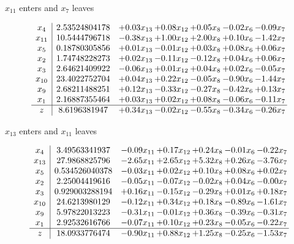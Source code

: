\documentclass[9pt]{article}
\begin{document}
 $ x_{11} $ enters and $ x_{7} $ leaves 

 \[\begin{array}{c| c c@{\hskip 2pt} c@{\hskip 2pt} c@{\hskip 2pt} c@{\hskip 2pt} c@{\hskip 2pt} }
 x_{4}   &  2.53524804178 & +  0.03 x_{13} & +  0.08 x_{12} & +  0.05 x_{8} & -0.02 x_{6} & -0.09 x_{7}\\
 x_{11}   &  10.5444796718 & -0.38 x_{13} & +  1.00 x_{12} & +  2.00 x_{8} & +  0.10 x_{6} & -1.42 x_{7}\\
 x_{5}   &  0.18780305856 & +  0.01 x_{13} & -0.01 x_{12} & +  0.03 x_{8} & +  0.08 x_{6} & +  0.06 x_{7}\\
 x_{2}   &  1.74748228273 & +  0.02 x_{13} & -0.11 x_{12} & -0.12 x_{8} & +  0.04 x_{6} & +  0.06 x_{7}\\
 x_{3}   &  2.64621409922 & -0.06 x_{13} & +  0.01 x_{12} & +  0.04 x_{8} & +  0.02 x_{6} & -0.05 x_{7}\\
 x_{10}   &  23.4022752704 & +  0.04 x_{13} & +  0.22 x_{12} & -0.05 x_{8} & -0.90 x_{6} & -1.44 x_{7}\\
 x_{9}   &  2.68211488251 & +  0.12 x_{13} & -0.33 x_{12} & -0.27 x_{8} & -0.42 x_{6} & +  0.13 x_{7}\\
 x_{1}   &  2.16887355464 & +  0.03 x_{13} & +  0.02 x_{12} & +  0.08 x_{8} & -0.06 x_{6} & -0.11 x_{7}\\
\hline
z    &  8.6196381947 & +  0.34 x_{13} & -0.02 x_{12} & -0.55 x_{8} & -0.34 x_{6} & -0.26 x_{7}\\
\end{array}\]


 $ x_{13} $ enters and $ x_{11} $ leaves 

 \[\begin{array}{c| c c@{\hskip 2pt} c@{\hskip 2pt} c@{\hskip 2pt} c@{\hskip 2pt} c@{\hskip 2pt} }
 x_{4}   &  3.49563341937 & -0.09 x_{11} & +  0.17 x_{12} & +  0.24 x_{8} & -0.01 x_{6} & -0.22 x_{7}\\
 x_{13}   &  27.9868825796 & -2.65 x_{11} & +  2.65 x_{12} & +  5.32 x_{8} & +  0.26 x_{6} & -3.76 x_{7}\\
 x_{5}   &  0.534526040378 & -0.03 x_{11} & +  0.02 x_{12} & +  0.10 x_{8} & +  0.08 x_{6} & +  0.02 x_{7}\\
 x_{2}   &  2.25004419616 & -0.05 x_{11} & -0.07 x_{12} & -0.02 x_{8} & +  0.04 x_{6} & -0.00 x_{7}\\
 x_{3}   &  0.929003288194 & +  0.16 x_{11} & -0.15 x_{12} & -0.29 x_{8} & +  0.01 x_{6} & +  0.18 x_{7}\\
 x_{10}   &  24.6213980129 & -0.12 x_{11} & +  0.34 x_{12} & +  0.18 x_{8} & -0.89 x_{6} & -1.61 x_{7}\\
 x_{9}   &  5.97822013223 & -0.31 x_{11} & -0.01 x_{12} & +  0.36 x_{8} & -0.39 x_{6} & -0.31 x_{7}\\
 x_{1}   &  2.92532616766 & -0.07 x_{11} & +  0.10 x_{12} & +  0.23 x_{8} & -0.05 x_{6} & -0.22 x_{7}\\
\hline
z    &  18.0933776474 & -0.90 x_{11} & +  0.88 x_{12} & +  1.25 x_{8} & -0.25 x_{6} & -1.53 x_{7}\\
\end{array}\]
\end{document}
